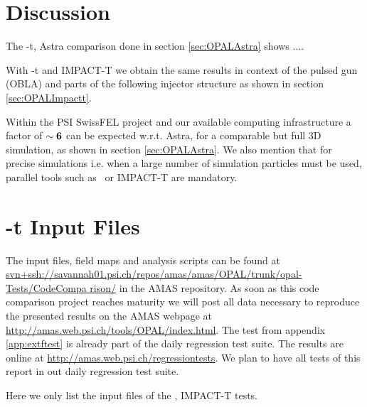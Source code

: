 \documentclass{psi-note}    %
\begin{document}

\section{Discussion}

The \opal-t, Astra comparison done in section \ref{sec:OPALAstra} shows ....

With \opal-t and IMPACT-T we obtain the same results in context of the pulsed
gun (OBLA) and parts of the following injector structure as shown in section
\ref{sec:OPALImpactt}.

Within the PSI SwissFEL project and our available computing infrastructure a    
factor of $\sim \bf 6$ can be expected w.r.t. Astra, for a comparable but full  
3D simulation, as shown in section \ref{sec:OPALAstra}. We also mention that    
for precise simulations i.e. when a large number of simulation particles must   
be used, parallel tools such as \opal\ or IMPACT-T are mandatory.               

\clearpage
\appendix
\section{\opal-t Input Files}
The input files, field maps and analysis scripts can be found at 
\url{svn+ssh://savannah01.psi.ch/repos/amas/amas/OPAL/trunk/opal-Tests/CodeCompa
rison/} in the AMAS repository. As soon as this code comparison project reaches
maturity we will post all data necessary to reproduce the presented results on
the AMAS webpage at \url{http://amas.web.psi.ch/tools/OPAL/index.html}. The test
from appendix \ref{app:extftest} is already part of the daily regression test
suite. The results are online at \url{http://amas.web.psi.ch/regressiontests}.
We plan to have all tests of this report in out daily regression test suite.

Here we only list the input files of the \opal, IMPACT-T tests.
\end{document}
